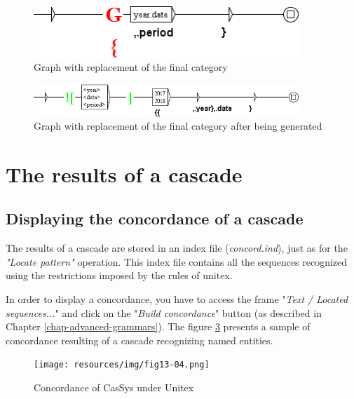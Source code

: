 \begin{figure}[!htb]
  \centering
  \includegraphics[width=10cm]{resources/img/graphe_remplacement.png}
  \caption{Graph with replacement of the final category}
  \label{fig:graphe_remplacement}
\end{figure}

\begin{figure}[!htb]
  \centering
  \includegraphics[width=10cm]{resources/img/graphe_remplacement_genere.png}
  \caption{Graph with replacement of the final category after being generated}
  \label{fig:graphe_remplacement_genere}
\end{figure}

\section{The results of a cascade}

\subsection{Displaying the concordance of a cascade}
\label{subsec:resultsCascade}

The results of a cascade are stored in an index file (\textit{concord.ind}), just as for the \textit{"Locate pattern"} operation. This index file contains all the sequences recognized using the restrictions imposed by the rules of unitex.

\bigskip
\noindent In order to display a concordance, you have to access the frame "\textit{Text / Located sequences...}" and click on the "\textit{Build concordance}" button (as described in Chapter \ref{chap-advanced-grammars}).
The figure \ref{fig13-04} presents a sample of concordance resulting of a cascade recognizing named entities. 
\begin{figure}[!htb]
  \centering
  \texttt{[image: resources/img/fig13-04.png]}
  \caption{Concordance of CasSys under Unitex}
  \label{fig13-04}
\end{figure}

